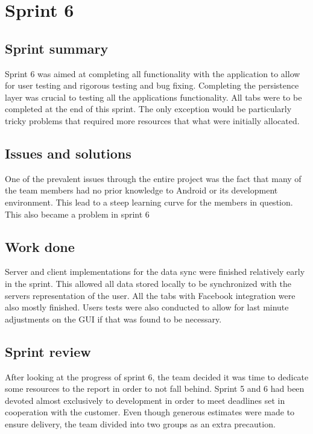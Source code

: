\section{Sprint 6}
\subsection{Sprint summary}
Sprint 6 was aimed at completing all functionality with the application to allow for user testing and rigorous testing and bug fixing. Completing the persistence layer was crucial to testing all the applications functionality. All tabs were to be completed at the end of this sprint. The only exception would be particularly tricky problems that required more resources that what were initially allocated.


\subsection{Issues and solutions}
One of the prevalent issues through the entire project was the fact that many of the team members had no prior knowledge to Android or its development environment. This lead to a steep learning curve for the members in question. This also became a problem in sprint 6 

\subsection{Work done}
Server and client implementations for the data sync were finished relatively early in the sprint. This allowed all data stored locally to be synchronized with the servers representation of the user. All the tabs with Facebook integration were also mostly finished. Users tests were also conducted to allow for last minute adjustments on the GUI if that was found to be necessary. 

\subsection{Sprint review}
After looking at the progress of sprint 6, the team decided it was time to dedicate some resources to the report in order to not fall behind. Sprint 5 and 6 had been devoted almost exclusively to development in order to meet deadlines set in cooperation with the customer. Even though generous estimates were made to ensure delivery, the team divided into two groups as an extra precaution. 